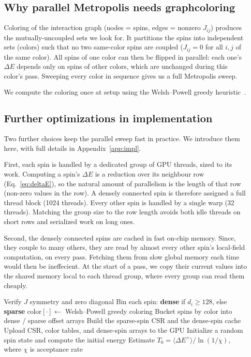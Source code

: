 \documentclass[pdflatex,sn-apa]{sn-jnl}%
\theoremstyle{thmstyleone}%
\theoremstyle{thmstyletwo}%
\theoremstyle{thmstylethree}%
\newcommand{\dE}{\Delta E}
\begin{document}
\subsection{Why parallel Metropolis needs graphcoloring}\label{sec:sa-coloring}

Coloring of the interaction graph (nodes = spins, edges = nonzero $J_{ij}$) produces the mutually-uncoupled sets we look for. It partitions the spins into independent sets (colors) such that no two same-color spins are coupled ($J_{ij} = 0$ for all $i,j$ of the same color). All spins of one color can then be flipped in parallel: each one's $\dE$ depends only on spins of other colors, which are unchanged during this color's pass. Sweeping every color in sequence gives us a full Metropolis sweep.

We compute the coloring once at setup using the Welsh--Powell greedy heuristic~\citep{WelshPowell1967}.

\subsection{Further optimizations in implementation}\label{sec:sa-impl}

Two further choices keep the parallel sweep fast in practice. We introduce them here, with full details in Appendix~\ref{app:impl}.

First, each spin is handled by a dedicated group of GPU threads, sized to its work. Computing a spin's $\dE$ is a reduction over its neighbour row (Eq.~\eqref{eq:deltaE}), so the natural amount of parallelism is the length of that row (non-zero values in the row). A densely connected spin is therefore assigned a full thread block (1024 threads). Every other spin is handled by a single warp (32 threads). Matching the group size to the row length avoids both idle threads on short rows and serialized work on long ones.

Second, the densely connected spins are cached in fast on-chip memory. Since, they couple to many others, they are read by almost every other spin's local-field computation, on every pass. Fetching them from slow global memory each time would then be ineffecient. At the start of a pass, we copy their current values into the shared memory local to each thread group, where every group can read them cheaply.

\begin{algorithm}[!htbp]
  \caption{One-time setup before annealing}
  \label{alg:setup}
  Verify $J$ symmetry and zero diagonal\;
  Bin each spin: \textbf{dense} if $d_i \geq 128$, else \textbf{sparse}\;
  $\mathrm{color}[\cdot] \leftarrow$ Welsh--Powell greedy
    coloring\;
  Bucket spins by color into dense / sparse offset arrays\;
  Build the sparse-spin CSR and the dense-spin cache\;
  Upload CSR, color tables, and dense-spin arrays to the GPU\;
  Initialize a random spin state and compute the initial energy\;
  Estimate $T_0 = \langle \dE^{+} \rangle / \ln(1/\chi)$, where $\chi$ is acceptance rate\;
\end{algorithm}
\end{document}
